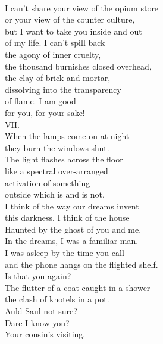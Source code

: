\documentclass[smalldemyvopaper,11pt,twoside,onecolumn,openright,extrafontsizes]{memoir}
\begin{document}
\\I can't share your view of the opium store
\\or your view of the counter culture,
\\but I want to take you inside and out
\\of my life. I can't spill back
\\the agony of inner cruelty,
\\the thousand burnishes closed overhead,
\\the clay of brick and mortar,
\\dissolving into the transparency
\\of flame. I am good
\\for you, for your sake!
\\VII.
\\When the lamps come on at night
\\they burn the windows shut.
\\The light flashes across the floor
\\like a spectral over-arranged
\\activation of something
\\outside which is and is not.
\\I think of the way our dreams invent
\\this darkness. I think of the house
\\Haunted by the ghost of you and me.
\\In the dreams, I was a familiar man.
\\I was asleep by the time you call
\\and the phone hangs on the flighted shelf.
\\Is that you again?
\\The flutter of a coat caught in a shower
\\the clash of knotels in a pot.
\\Auld Saul not sure?
\\Dare I know you?
\\Your cousin's visiting.
\end{document}
